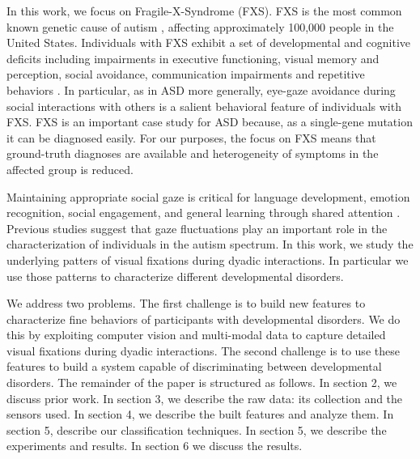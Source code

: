 \documentclass{llncs}
\begin{document}
  In this work, we focus on Fragile-X-Syndrome (FXS). FXS is the most common known genetic cause of autism \cite{Hagerman:2008wg}, affecting approximately 100,000 people in the United States. Individuals with FXS exhibit a set of developmental and cognitive deficits including impairments in executive functioning, visual memory and perception, social avoidance, communication impairments and repetitive behaviors \cite{Sullivan:2007gz}. In particular, as in ASD more generally, eye-gaze avoidance during social interactions with others is a salient behavioral feature of individuals with FXS. FXS is an important case study for ASD because, as a single-gene mutation it can be diagnosed easily. For our purposes, the focus on FXS means that ground-truth diagnoses are available and heterogeneity of symptoms in the affected group is reduced.

  Maintaining appropriate social gaze is critical for language development, emotion recognition, social engagement, and general learning through shared attention \cite{Csibra:2006wf}. Previous studies \cite{klin2002} suggest that gaze fluctuations play an important role in the characterization of individuals in the autism spectrum. In this work, we study the underlying patters of visual fixations during dyadic interactions. In particular we use those patterns to characterize different developmental disorders.

  We address two problems. The first challenge is to build new features to characterize fine behaviors of participants with developmental disorders. We do this by exploiting computer vision and multi-modal data to capture detailed visual fixations during dyadic interactions. The second challenge is to use these features to build a system capable of discriminating between developmental disorders. The remainder of the paper is structured as follows. In section 2, we discuss prior work. In section 3, we describe the raw data: its collection and the sensors used. In section 4, we describe the built features and analyze them. In section 5, describe our classification techniques. In section 5, we describe the experiments and results. In section 6 we discuss the results.
\end{document}

